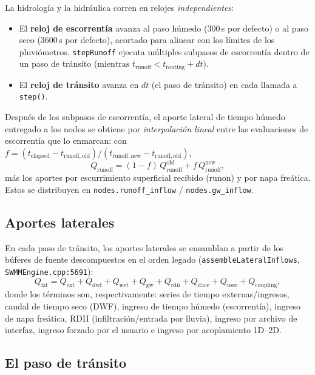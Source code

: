 \documentclass[11pt,a4paper]{article}
\begin{document}
La hidrología y la hidráulica corren en relojes \emph{independientes}:
\begin{itemize}[nosep]
  \item El \textbf{reloj de escorrentía} avanza al paso húmedo (300\,s por
        defecto) o al paso seco (3600\,s por defecto), acortado para alinear
        con los límites de los pluviómetros. \texttt{stepRunoff} ejecuta
        múltiples subpasos de escorrentía dentro de un paso de tránsito
        ($\text{mientras } t_{\mathrm{runoff}} < t_{\mathrm{routing}} + dt$).
  \item El \textbf{reloj de tránsito} avanza en $dt$ (el paso de tránsito) en
        cada llamada a \texttt{step()}.
\end{itemize}
Después de los subpasos de escorrentía, el aporte lateral de tiempo húmedo
entregado a los nodos se obtiene por \emph{interpolación lineal} entre las
evaluaciones de escorrentía que lo enmarcan: con $f = (t_{\mathrm{elapsed}} -
t_{\mathrm{runoff,old}}) / (t_{\mathrm{runoff,new}} - t_{\mathrm{runoff,old}})$,
\begin{equation}
  Q_{\mathrm{runoff}} = (1-f)\,Q_{\mathrm{runoff}}^{\mathrm{old}} +
  f\,Q_{\mathrm{runoff}}^{\mathrm{new}},
\end{equation}
más los aportes por escurrimiento superficial recibido (runon) y por napa
freática. Estos se distribuyen en \texttt{nodes.runoff\_inflow} /
\texttt{nodes.gw\_inflow}.

\subsection{Aportes laterales}

En cada paso de tránsito, los aportes laterales se ensamblan a partir de los
búferes de fuente descompuestos en el orden legado
(\texttt{assembleLateralInflows}, \texttt{SWMMEngine.cpp:5691}):
\begin{equation}
  Q_{\mathrm{lat}} = Q_{\mathrm{ext}} + Q_{\mathrm{dwf}} +
  Q_{\mathrm{wet}} + Q_{\mathrm{gw}} + Q_{\mathrm{rdii}} +
  Q_{\mathrm{iface}} + Q_{\mathrm{user}} + Q_{\mathrm{coupling}},
\end{equation}
donde los términos son, respectivamente: series de tiempo externas/ingresos,
caudal de tiempo seco (DWF), ingreso de tiempo húmedo (escorrentía), ingreso de
napa freática, RDII (infiltración/entrada por lluvia), ingreso por archivo de
interfaz, ingreso forzado por el usuario e ingreso por acoplamiento 1D--2D.

\subsection{El paso de tránsito}
\end{document}
